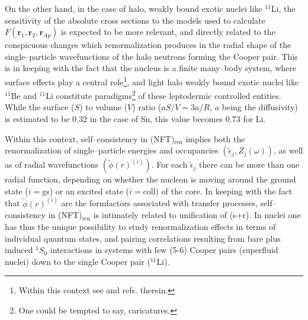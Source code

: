 On the other hand, in the case of halo, weakly bound exotic nuclei like $^{11}$Li, the sensitivity of the absolute cross sections to the models used to calculate $F(\mathbf r_1,\mathbf r_2,\mathbf r_{Ap})$ is expected to be more relevant, and directly related to the conspicuous changes which renormalization produces in the radial shape of the single--particle wavefunctions of the halo neutrons forming the Cooper pair. This is in keeping with  the fact that the nucleus is a finite many--body system, where surface effects play a central role\footnote{Within this context see \cite{Broglia:02d} and refs. therein.}, and light halo weakly bound exotic nuclei like $^{11}$Be and $^{11}$Li constitute paradigms\footnote{One could be tempted to say, caricatures.} of these leptodermic controlled entities.  While the surface ($S$) to volume ($V$) ratio ($aS/V=3a/R$, $a$ being the diffusivity) is estimated to be 0.32 in the case of Sn, this value becomes 0.73 for Li.

Within this context, self--consistency in (NFT)$_{\text{ren}}$ implies both the renormalization of single--particle energies and occupancies $(\tilde\epsilon_j,Z_j(\omega))$, as well as of radial wavefunctions $(\tilde\phi(r)^{(i)})$. For each $\tilde\epsilon_j$ there can be more than one radial function, depending on whether the nucleon is moving around the ground state ($i=$gs) or an excited state ($i=$coll) of the core. In keeping with the fact that $\tilde{\phi}(r)^{(i)}$ are the formfactors associated with transfer processes, self--consistency in (NFT)$_{\text{ren}}$ is intimately related to unification of (s+r). In nuclei one has thus the unique possibility to study renormalization effects in terms of individual quantum states, and pairing correlations resulting from bare plus induced $^1S_0$ interactions in systems with few (5-6) Cooper pairs (superfluid nuclei) down to the single Cooper pair ($^{11}$Li).




















